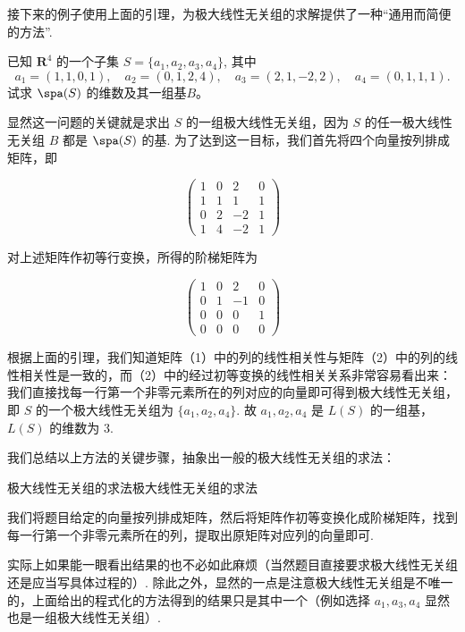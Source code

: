 接下来的例子使用上面的引理，为极大线性无关组的求解提供了一种``通用而简便的方法''.

\begin{example}{}{}
    已知 $\mathbf{R}^4$ 的一个子集 $S = \{a_1, a_2, a_3, a_4\}$, 其中
    \[
    a_1 = (1,1,0,1), \quad a_2 = (0,1,2,4), \quad
    a_3 = (2,1,-2,2), \quad a_4 = (0,1,1,1).
    \]
    试求 $\spa(S)$ 的维数及其一组基$B$。
\end{example}

\begin{solution}

显然这一问题的关键就是求出 $S$ 的一组极大线性无关组，因为 $S$ 的任一极大线性无关组 $B$ 都是 $\spa(S)$ 的基. 为了达到这一目标，我们首先将四个向量按列排成矩阵，即

\[\begin{pmatrix}
    1 & 0 & 2 & 0 \\
    1 & 1 & 1 & 1 \\
    0 & 2 & -2 & 1 \\
    1 & 4 & -2 & 1
\end{pmatrix} \tag{1}\]

对上述矩阵作初等行变换，所得的阶梯矩阵为

\[\begin{pmatrix}
    1 & 0 & 2 & 0 \\
    0 & 1 & -1 & 0 \\
    0 & 0 & 0 & 1 \\
    0 & 0 & 0 & 0
\end{pmatrix} \tag{2}\]

根据上面的引理，我们知道矩阵（1）中的列的线性相关性与矩阵（2）中的列的线性相关性是一致的，而（2）中的经过初等变换的线性相关关系非常容易看出来：我们直接找每一行第一个非零元素所在的列对应的向量即可得到极大线性无关组，即 $S$ 的一个极大线性无关组为 $\{a_1, a_2, a_4\}$. 故 $a_1, a_2, a_4$ 是 $L(S)$ 的一组基，$L(S)$ 的维数为 3.
\end{solution}

我们总结以上方法的关键步骤，抽象出一般的极大线性无关组的求法：
\begin{lemma}{极大线性无关组的求法}{极大线性无关组的求法}

    我们将题目给定的向量按列排成矩阵，然后将矩阵作初等变换化成阶梯矩阵，找到每一行第一个非零元素所在的列，提取出原矩阵对应列的向量即可.
\end{lemma}

实际上如果能一眼看出结果的也不必如此麻烦（当然题目直接要求极大线性无关组还是应当写具体过程的）. 除此之外，显然的一点是注意极大线性无关组是不唯一的，上面给出的程式化的方法得到的结果只是其中一个（例如选择 $a_1,a_3,a_4$ 显然也是一组极大线性无关组）.

